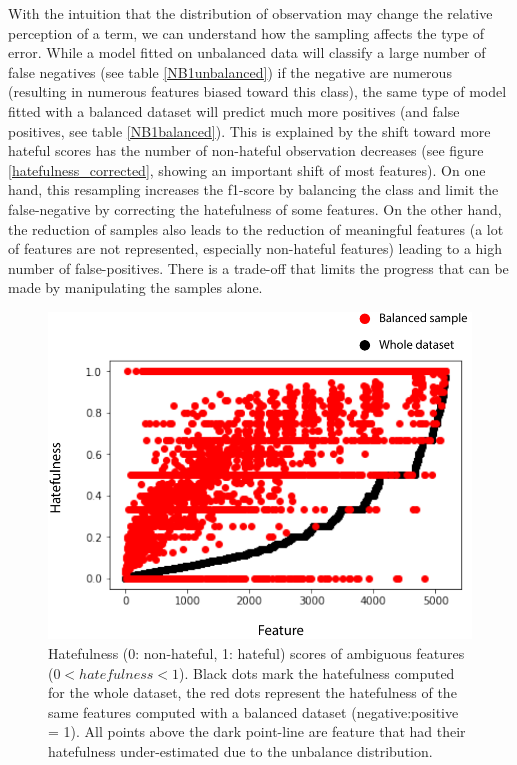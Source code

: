 \documentclass[a4paper]{tufte-handout}
\begin{document}
\begin{fullwidth}
With the intuition that the distribution of observation may change the relative perception of a term, we can understand how the sampling affects the type of error. While a model fitted on unbalanced data will classify a large number of false negatives (see table \ref{NB1unbalanced}) if the negative are numerous (resulting in numerous features biased toward this class), the same type of model fitted with a balanced dataset will predict much more positives (and false positives, see table \ref{NB1balanced}). This is explained by the shift toward more hateful scores has the number of non-hateful observation decreases (see figure \ref{hatefulness_corrected}, showing an important shift of most features). On one hand, this resampling increases the f1-score by balancing the class and limit the false-negative by correcting the hatefulness of some features. On the other hand, the reduction of samples also leads to the reduction of meaningful features (a lot of features are not represented, especially non-hateful features) leading to a high number of false-positives. There is a trade-off that limits the progress that can be made by manipulating the samples alone.

\begin{figure}\label{hatefulness_corrected}
  \includegraphics[]{images/hatefulness_corrected.pdf}
  \caption{Hatefulness (0: non-hateful, 1: hateful) scores of ambiguous features ($0 < hatefulness < 1$). Black dots mark the hatefulness computed for the whole dataset, the red dots represent the hatefulness of the same features computed with a balanced dataset (negative:positive = 1). All points above the dark point-line are feature that had their hatefulness under-estimated due to the unbalance  distribution.}
  \label{fig:marginfig}
\end{figure}




\end{fullwidth}
\end{document}
